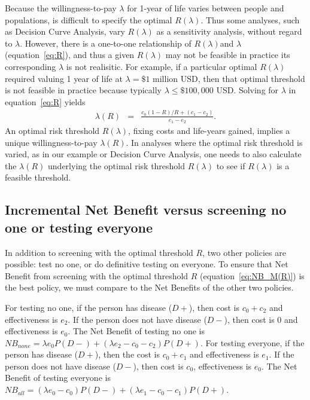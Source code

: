 \documentclass[AMA,STIX1COL]{WileyNJD-v2}
\begin{document}
Because the willingness-to-pay $\lambda$ for 1-year of life varies between people and populations, is difficult to specify the optimal $R(\lambda)$. Thus some analyses, such as Decision Curve Analysis\cite{Vickers2006}, vary $R(\lambda)$ as a sensitivity analysis, without regard to $\lambda$.  However, there is a one-to-one relationship of $R(\lambda)$and $\lambda$ (equation~\ref{eq:R}), and thus a given $R(\lambda)$ may not be feasible in practice its corresponding $\lambda$ is not realisitic.  For example, if a particular optimal $R(\lambda)$ required valuing 1 year of life at $\lambda=\$1$ million USD, then that optimal threshold is not feasible in practice because typically $\lambda\le\$100,000$ USD.  Solving for $\lambda$ in equation~\ref{eq:R} yields
\begin{eqnarray}
\label{eq:dollarsperLYG}
\lambda(R) &=& \frac{c_0(1-R)/R + (c_1-c_2)}{e_1-e_2}.
\end{eqnarray}
An optimal risk threshold $R(\lambda)$, fixing costs and life-years gained, implies a unique willingness-to-pay $\lambda(R)$.  In analyses where the optimal risk threshold is varied, as in our example or Decision Curve Analysis\cite{Vickers2006}, one needs to also calculate the $\lambda(R)$ underlying the optimal risk threshold $R(\lambda)$ to see if $R(\lambda)$ is a feasible threshold.  
 

\subsection{Incremental Net Benefit versus screening no one or testing everyone}
\label{sec:INBgain}
In addition to screening with the optimal threshold $R$, two other policies are possible:  test no one, or do definitive testing on everyone.  To ensure that Net Benefit from screening with the optimal threshold $R$ (equation~\ref{eq:NB_M(R)}) is the best policy, we must compare to the Net Benefits of the other two policies.

For testing no one, if the person has disease ($D+$), then cost is $c_0+c_2$ and effectiveness is $e_2$.  If the person does not have disease ($D-$), then cost is 0 and effectiveness is $e_0$.  The Net Benefit of testing no one is $N\!B_{none} = \lambda e_0P(D-)+ (\lambda e_2-c_0-c_2)P(D+)$.  For testing everyone, if the person has disease ($D+$), then the cost is $c_0+c_1$ and effectiveness is $e_1$.  If the person does not have disease ($D-$), then cost is $c_0$, effectiveness is $e_0$.  The Net Benefit of testing everyone is 
$N\!B_{all} = (\lambda e_0-c_0)P(D-) + (\lambda e_1-c_0-c_1)P(D+)$. 
\end{document}
